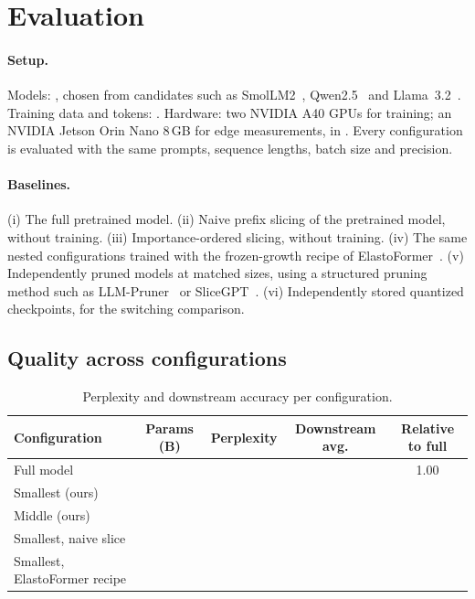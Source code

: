 \section{Evaluation}
\label{sec:eval}

\paragraph{Setup.}
Models: , chosen from candidates such as SmolLM2~\cite{allal2025smollm2}, Qwen2.5~\cite{qwen2025qwen25} and Llama~3.2~\cite{meta2024llama32}. Training data and tokens: . Hardware: two NVIDIA A40 GPUs for training; an NVIDIA Jetson Orin Nano 8\,GB for edge measurements, in . Every configuration is evaluated with the same prompts, sequence lengths, batch size and precision. 

\paragraph{Baselines.}
(i) The full pretrained model. (ii) Naive prefix slicing of the pretrained model, without training. (iii) Importance-ordered slicing, without training. (iv) The same nested configurations trained with the frozen-growth recipe of ElastoFormer~\cite{kalra2025elastoformer}. (v) Independently pruned models at matched sizes, using a structured pruning method such as LLM-Pruner~\cite{ma2023llmpruner} or SliceGPT~\cite{ashkboos2024slicegpt}. (vi) Independently stored quantized checkpoints, for the switching comparison.

\subsection{Quality across configurations}

\begin{table}[t]
  \caption{Perplexity and downstream accuracy per configuration. }
  \label{tab:quality}
  \begin{tabular}{lcccc}
    \toprule
    Configuration & Params (B) & Perplexity & Downstream avg. & Relative to full \\
    \midrule
    Full model       & \TODO{} & \TODO{} & \TODO{} & 1.00 \\
    Smallest (ours)  & \TODO{} & \TODO{} & \TODO{} & \TODO{} \\
    Middle (ours)    & \TODO{} & \TODO{} & \TODO{} & \TODO{} \\
    Smallest, naive slice & \TODO{} & \TODO{} & \TODO{} & \TODO{} \\
    Smallest, ElastoFormer recipe & \TODO{} & \TODO{} & \TODO{} & \TODO{} \\
    \bottomrule
  \end{tabular}
\end{table}

